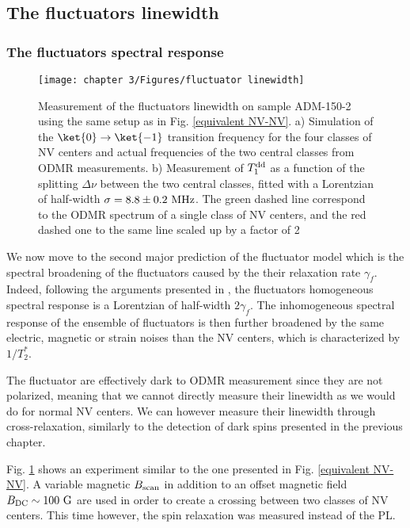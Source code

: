 \documentclass[a4paper, 11pt]{report}
\begin{document}
\subsection{The fluctuators linewidth}

\subsubsection{The fluctuators spectral response}
\begin{figure}[h]
\centering
\texttt{[image: chapter 3/Figures/fluctuator linewidth]}
\caption{Measurement of the fluctuators linewidth on sample ADM-150-2 using the same setup as in Fig. \ref{equivalent NV-NV}. a) Simulation of the $\ket{0} \to \ket{-1}$ transition frequency for the four classes of NV centers and actual frequencies of the two central classes from ODMR measurements. b) Measurement of $T_1^{\rm dd}$ as a function of the splitting $\Delta \nu$ between the two central classes, fitted with a Lorentzian of half-width $\sigma=8.8 \pm 0.2\ \rm MHz$. The green dashed line correspond to the ODMR spectrum of a single class of NV centers, and the red dashed one to the same line scaled up by a factor of 2}
\label{fluct linewidth}
\end{figure}

We now move to the second major prediction of the fluctuator model which is the spectral broadening of the fluctuators caused by the their relaxation rate $\gamma_f$. Indeed, following the arguments presented in \citep{choi2017depolarization}, the fluctuators homogeneous spectral response is a Lorentzian of half-width $2\gamma_f$. The inhomogeneous spectral response of the ensemble of fluctuators is then further broadened by the same electric, magnetic or strain noises than the NV centers, which is characterized by $1/T_2^*$.

The fluctuator are effectively dark to ODMR measurement since they are not polarized, meaning that we cannot directly measure their linewidth as we would do for normal NV centers. We can however measure their linewidth through cross-relaxation, similarly to the detection of dark spins presented in the previous chapter.

Fig. \ref{fluct linewidth} shows an experiment similar to the one presented in Fig. \ref{equivalent NV-NV}. A variable magnetic $B_{\rm scan}$ in addition to an offset magnetic field $B_{\rm DC} \sim 100\ \rm G$ are used in order to create a crossing between two classes of NV centers. This time however, the spin relaxation was measured instead of the PL.
\end{document}
